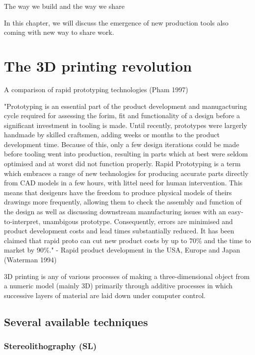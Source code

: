 The way we build and the way we share

In this chapter, we will discuss the emergence of new production tools also coming with new way to share work.

\section{The 3D printing revolution} %

A comparison of rapid prototyping technologies (Pham 1997)

"Prototyping is an essential part of the product development and manugacturing cycle required for assessing the forim, fit and functionality of a design before a significant investment in tooling is made.
Until recently, prototypes were largerly handmade by skilled craftsmen, adding weeks or months to the product development time.
Because of this, only a few design iterations could be made before tooling went into production, resulting in parts which at best were seldom optimised and at worst did not function properly.
Rapid Prototyping is a term which embraces a range of new technologies for producing accurate parts directly from CAD models in a few hours, with littel need for human intervention.
This means that desigenrs have the freedom to produce physical models of theirs drawings more frequently, allowing them to check the assembly and function of the design as well as discussing downstream manufacturing issues with an easy-to-interpret, unambigous prototype.
Consequently, errors are minimised and product development costs and lead times substantially reduced.
It has been claimed that rapid proto can cut new product costs by up to 70\% and the time to market by 90\%."
- Rapid product development in the USA, Europe and Japan (Waterman 1994)

3D printing is any of various processes of making a three-dimensional object from a numeric model (mainly 3D) primarily through additive processes in which successive layers of material are laid down under computer control.

\subsection{Several available techniques} %

\subsubsection{Stereolithography (SL)} %

